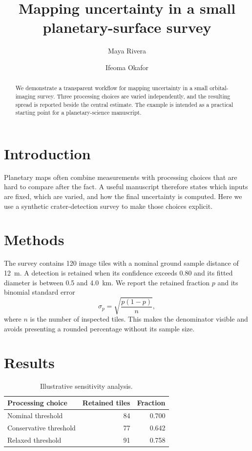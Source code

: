 \documentclass[review,article]{planetary}
\title{Mapping uncertainty in a small planetary-surface survey}
\author[1]{Maya Rivera}
\author[2]{Ifeoma Okafor}
\affil[1]{Example Planetary Science Centre, Example University}
\affil[2]{Remote Sensing Methods Lab, Example Institute}
\date{}
\begin{document}
\maketitle
\thispagestyle{firstpage}
\correspondingauthor
{}

\begin{abstract}
We demonstrate a transparent workflow for mapping uncertainty in a small
orbital-imaging survey. Three processing choices are varied independently, and
the resulting spread is reported beside the central estimate. The example is
intended as a practical starting point for a planetary-science manuscript.
\end{abstract}

\section{Introduction}
Planetary maps often combine measurements with processing choices that are
hard to compare after the fact. A useful manuscript therefore states which
inputs are fixed, which are varied, and how the final uncertainty is computed.
Here we use a synthetic crater-detection survey to make those choices explicit.

\section{Methods}
The survey contains 120 image tiles with a nominal ground sample distance of
12~m. A detection is retained when its confidence exceeds 0.80 and its fitted
diameter is between 0.5 and 4.0~km. We report the retained fraction $p$ and its
binomial standard error
\begin{equation}
  \sigma_p = \sqrt{\frac{p(1-p)}{n}},
  \label{eq:error}
\end{equation}
where $n$ is the number of inspected tiles. This makes the denominator visible
and avoids presenting a rounded percentage without its sample size.

\section{Results}
\begin{table}[ht]
\mytablestyle
\caption{Illustrative sensitivity analysis.}
\begin{tabular}{lrr}
\toprule
Processing choice & Retained tiles & Fraction \\
\midrule
Nominal threshold & 84 & 0.700 \\
Conservative threshold & 77 & 0.642 \\
Relaxed threshold & 91 & 0.758 \\
\bottomrule
\end{tabular}
\label{tab:sensitivity}
\end{table}
\end{document}
